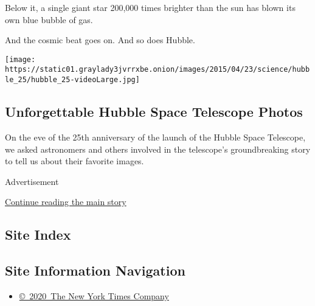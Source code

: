 Below it, a single giant star 200,000 times brighter than the sun has
blown its own blue bubble of gas.

And the cosmic beat goes on. And so does Hubble.

\href{https://www.nytimes3xbfgragh.onion/interactive/2015/04/23/science/space/unforgettable-hubble-space-telescope-photos.html}{}

\texttt{[image: https://static01.graylady3jvrrxbe.onion/images/2015/04/23/science/hubble\_25/hubble\_25-videoLarge.jpg]}

\hypertarget{unforgettable-hubble-space-telescope-photos}{%
\subsection{Unforgettable Hubble Space Telescope
Photos}\label{unforgettable-hubble-space-telescope-photos}}

On the eve of the 25th anniversary of the launch of the Hubble Space
Telescope, we asked astronomers and others involved in the telescope's
groundbreaking story to tell us about their favorite images.

Advertisement

\protect\hyperlink{after-bottom}{Continue reading the main story}

\hypertarget{site-index}{%
\subsection{Site Index}\label{site-index}}

\hypertarget{site-information-navigation}{%
\subsection{Site Information
Navigation}\label{site-information-navigation}}

\begin{itemize}
\tightlist
\item
  \href{https://help.nytimes3xbfgragh.onion/hc/en-us/articles/115014792127-Copyright-notice}{©~2020~The
  New York Times Company}
\end{itemize}

